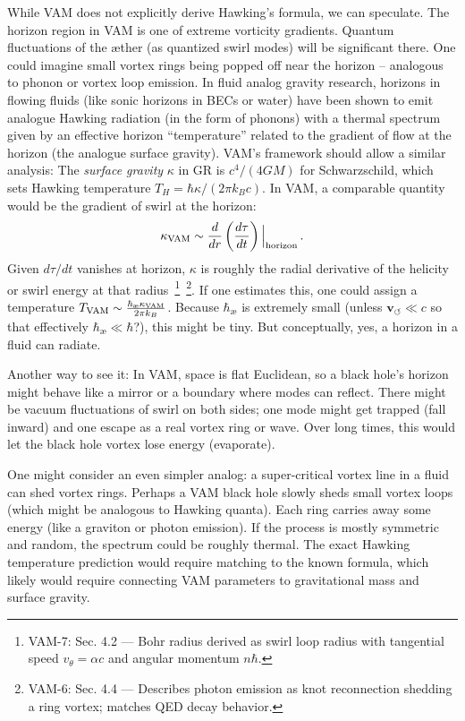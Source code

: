 \documentclass[a4paper,12pt]{article}
\begin{document}
    While VAM does not explicitly derive Hawking’s formula, we can speculate. The horizon region in VAM is one of extreme vorticity gradients. Quantum fluctuations of the æther (as quantized swirl modes) will be significant there. One could imagine small vortex rings being popped off near the horizon – analogous to phonon or vortex loop emission. In fluid analog gravity research, horizons in flowing fluids (like sonic horizons in BECs or water) have been shown to emit analogue Hawking radiation (in the form of phonons) with a thermal spectrum given by an effective horizon “temperature” related to the gradient of flow at the horizon (the analogue surface gravity). VAM’s framework should allow a similar analysis: The \emph{surface gravity} $\kappa$ in GR is $c^4/(4GM)$ for Schwarzschild, which sets Hawking temperature $T_H = \hbar \kappa/(2\pi k_B c)$. In VAM, a comparable quantity would be the gradient of swirl at the horizon:
    \[
        \kappa_{\rm VAM} \sim \frac{d}{dr}\left(\frac{d\tau}{dt}\right) \Big|_{\rm horizon}\,.
    \]
    Given $d\tau/dt$ vanishes at horizon, $\kappa$ is roughly the radial derivative of the helicity or swirl energy at that radius~\footnote{VAM-7: Sec. 4.2 — Bohr radius derived as swirl loop radius with tangential speed $v_\theta = \alpha c$ and angular momentum $n\hbar$.}~\footnote{VAM-6: Sec. 4.4 — Describes photon emission as knot reconnection shedding a ring vortex; matches QED decay behavior.}. If one estimates this, one could assign a temperature $T_{\rm VAM} \sim \frac{\hbar_{\text{\ae}} \kappa_{\rm VAM}}{2\pi k_B}$. Because $\hbar_{\text{\ae}}$ is extremely small (unless $\mathbf{v}_{\scriptscriptstyle\boldsymbol{\circlearrowleft}} \ll c$ so that effectively $\hbar_{\text{\ae}} \ll \hbar$?), this might be tiny. But conceptually, yes, a horizon in a fluid can radiate.

    Another way to see it: In VAM, space is flat Euclidean, so a black hole’s horizon might behave like a mirror or a boundary where modes can reflect. There might be vacuum fluctuations of swirl on both sides; one mode might get trapped (fall inward) and one escape as a real vortex ring or wave. Over long times, this would let the black hole vortex lose energy (evaporate).

    One might consider an even simpler analog: a super-critical vortex line in a fluid can shed vortex rings. Perhaps a VAM black hole slowly sheds small vortex loops (which might be analogous to Hawking quanta). Each ring carries away some energy (like a graviton or photon emission). If the process is mostly symmetric and random, the spectrum could be roughly thermal. The exact Hawking temperature prediction would require matching to the known formula, which likely would require connecting VAM parameters to gravitational mass and surface gravity.
\end{document}
